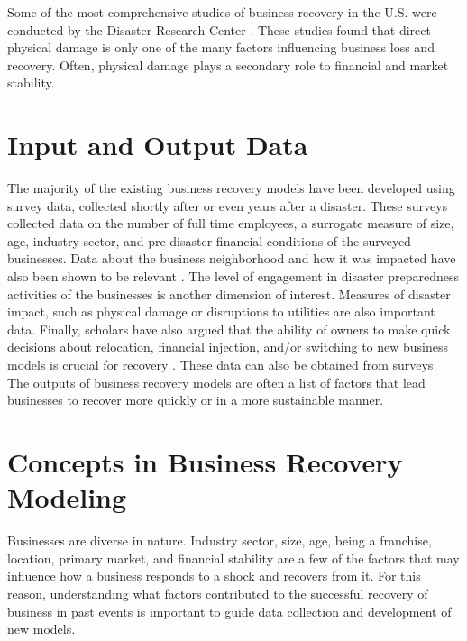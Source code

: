 Some of the most comprehensive studies of business recovery in the U.S. were conducted by the Disaster Research Center \citep{webb2000businesses}. These studies found that direct physical damage is only one of the many factors influencing business loss and recovery. Often, physical damage plays a secondary role to financial and market stability.\ 

\section{Input and Output Data} 
The majority of the existing business recovery models have been developed using survey data, collected shortly after or even years after a disaster. These surveys collected data on the number of full time employees, a surrogate measure of size, age, industry sector, and pre-disaster financial conditions of the surveyed businesses. Data about the business neighborhood and how it was impacted have also been shown to be relevant \citep{chang2010urban}. The level of engagement in disaster preparedness activities of the businesses is another dimension of interest. Measures of disaster impact, such as physical damage or disruptions to utilities are also important data. Finally, scholars have also argued that the ability of owners to make quick decisions about relocation, financial injection, and/or switching to new business models is crucial for recovery \citep{stevenson2014organizational,morrish2011entrepreneurial}. These data can also be obtained from surveys. The outputs of business recovery models are often a list of factors that lead businesses to recover more quickly or in a more sustainable manner.\

\section{Concepts in Business Recovery Modeling} 
Businesses are diverse in nature. Industry sector, size, age, being a franchise, location, primary market, and financial stability are a few of the factors that may influence how a business responds to a shock and recovers from it. For this reason, understanding what factors contributed to the successful recovery of business in past events is important to guide data collection and development of new models.\ 


